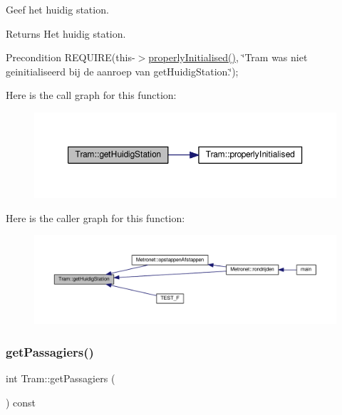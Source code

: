 Geef het huidig station. 

\begin{DoxyReturn}{Returns}
Het huidig station. 
\end{DoxyReturn}
\begin{DoxyPrecond}{Precondition}
R\+E\+Q\+U\+I\+RE(this-\/$>$\hyperlink{class_tram_ac2688f590e4db232b4f535c9bf959efb}{properly\+Initialised()}, \char`\"{}\+Tram was niet geinitialiseerd bij de aanroep van get\+Huidig\+Station.\char`\"{}); 
\end{DoxyPrecond}
Here is the call graph for this function\+:\nopagebreak
\begin{figure}[H]
\begin{center}
\leavevmode
\includegraphics[width=350pt]{class_tram_ae1d03c1fb6e0f5f97c57d35fe10fa8dd_cgraph}
\end{center}
\end{figure}
Here is the caller graph for this function\+:\nopagebreak
\begin{figure}[H]
\begin{center}
\leavevmode
\includegraphics[width=350pt]{class_tram_ae1d03c1fb6e0f5f97c57d35fe10fa8dd_icgraph}
\end{center}
\end{figure}
\mbox{\label{class_tram_a678ba2cd0c6ab76e966947944f599d56}} 
\subsubsection{\texorpdfstring{get\+Passagiers()}{getPassagiers()}}
{\footnotesize\ttfamily int Tram\+::get\+Passagiers (\begin{DoxyParamCaption}{ }\end{DoxyParamCaption}) const}



